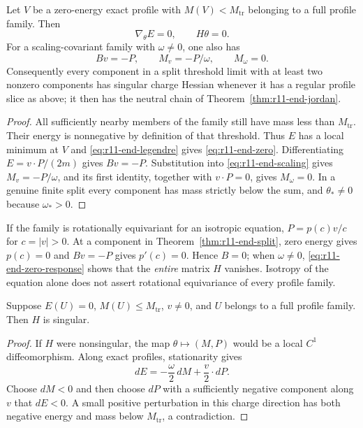 \begin{theorem}
\label{thm:r11-end-split}
Let $V$ be a zero-energy exact profile with $M(V)<M_{\mathrm{tr}}$
belonging to a full profile family.  Then
\begin{equation}\label{eq:r11-end-zero}
 \nabla_\theta E=0,\qquad H\theta=0.
\end{equation}
For a scaling-covariant family with $\omega\ne0$, one also has
\begin{equation}\label{eq:r11-end-zero-response}
 Bv=-P,\qquad M_v=-P/\omega,\qquad M_\omega=0.
\end{equation}
Consequently every component in a split threshold limit with at least two
nonzero components has singular charge Hessian whenever it has a regular
profile slice as above; it then has the neutral chain of
Theorem~\ref{thm:r11-end-jordan}.
\end{theorem}
\begin{proof}
All sufficiently nearby members of the family still have mass less than
$M_{\mathrm{tr}}$.  Their energy is nonnegative by definition of that
threshold.  Thus $E$ has a local minimum at $V$ and
\eqref{eq:r11-end-legendre} gives \eqref{eq:r11-end-zero}.
Differentiating $E=v\cdot P/(2m)$ gives $Bv=-P$.  Substitution into
\eqref{eq:r11-end-scaling} gives $M_v=-P/\omega$, and its first
identity, together with $v\cdot P=0$, gives $M_\omega=0$.
In a genuine finite split every component has mass strictly below the
sum, and $\theta_*\ne0$ because $\omega_*>0$.
\end{proof}

If the family is rotationally equivariant for an isotropic equation,
$P=p(c)v/c$ for $c=|v|>0$.  At a component in
Theorem~\ref{thm:r11-end-split}, zero energy gives $p(c)=0$ and
$Bv=-P$ gives $p'(c)=0$.  Hence $B=0$; when $\omega\ne0$,
\eqref{eq:r11-end-zero-response} shows that the \emph{entire} matrix
$H$ vanishes.  Isotropy of the equation alone does not assert rotational
equivariance of every profile family.

\begin{proposition}
\label{prop:r11-end-moving}
Suppose $E(U)=0$, $M(U)\le M_{\mathrm{tr}}$, $v\ne0$, and $U$
belongs to a full profile family.  Then $H$ is singular.
\end{proposition}
\begin{proof}
If $H$ were nonsingular, the map $\theta\mapsto(M,P)$ would be a local
$C^1$ diffeomorphism.  Along exact profiles, stationarity gives
\[
 dE=-\frac\omega2\,dM+\frac v2\cdot dP.
\]
Choose $dM<0$ and then choose $dP$ with a sufficiently negative component
along $v$ that $dE<0$.  A small positive perturbation in this charge
direction has both negative energy and mass below $M_{\mathrm{tr}}$,
a contradiction.
\end{proof}

